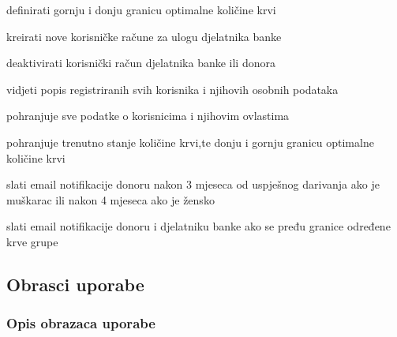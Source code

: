 \begin{packed_enum}
\begin{packed_enum}
		\item definirati gornju i donju granicu optimalne količine krvi
		\item kreirati nove korisničke račune za ulogu djelatnika banke
		\item deaktivirati korisnički račun djelatnika banke ili donora
		\item vidjeti popis registriranih svih korisnika i njihovih osobnih podataka
		
	\end{packed_enum}
	
	\item  {}
	
	\begin{packed_enum}
		
		\item pohranjuje sve podatke o korisnicima i njihovim ovlastima
		\item pohranjuje trenutno stanje količine krvi,te donju i gornju granicu optimalne količine krvi
		
	\end{packed_enum}
	
	\item  {}
	
	\begin{packed_enum}
		
		\item slati email notifikacije donoru nakon 3 mjeseca od uspješnog darivanja ako je muškarac ili nakon 4 mjeseca ako je žensko
		\item slati email notifikacije donoru i djelatniku banke ako se pređu granice određene krve grupe
		
	\end{packed_enum}
\end{packed_enum}



\eject 



\subsection{Obrasci uporabe}

\subsubsection{Opis obrazaca uporabe}


